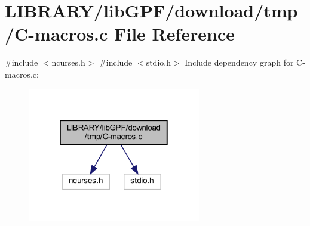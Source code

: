\hypertarget{C-macros_8c}{}\section{L\+I\+B\+R\+A\+R\+Y/lib\+G\+P\+F/download/tmp/\+C-\/macros.c File Reference}
\label{C-macros_8c}
{\ttfamily \#include $<$ncurses.\+h$>$}\newline
{\ttfamily \#include $<$stdio.\+h$>$}\newline
Include dependency graph for C-\/macros.c\+:
\nopagebreak
\begin{figure}[H]
\begin{center}
\leavevmode
\includegraphics[width=214pt]{C-macros_8c__incl}
\end{center}
\end{figure}
